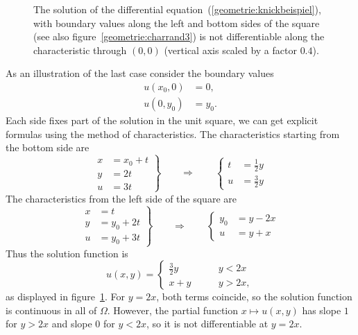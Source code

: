 \begin{figure}
\centering
{}
\caption{The solution of the differential
equation~(\ref{geometrie:knickbeispiel}),
with boundary values along the left and bottom sides of the square
(see also figure~\ref{geometrie:charrand3})
is not differentiable along the characteristic through $(0,0)$
(vertical axis scaled by a factor $0.4$).
\label{geometrie:knick}}
\end{figure}

As an illustration of the last case consider the boundary values
\begin{align*}
u(x_0,0)&=0,\\
u(0,y_0)&=y_0.
\end{align*}
Each side fixes part of the solution in the unit square, we can get 
explicit formulas using the method of characteristics.
The characteristics starting from the bottom side are
\[
\left.
\begin{aligned}
x&=x_0+t\\
y&=2t\\
u&=3t
\end{aligned}
\right\}
\qquad\Rightarrow\qquad
\left\{
\begin{aligned}
t&=\frac12y\\
u&=\frac32y
\end{aligned}
\right.
\]
The characteristics from the left side of the square are
\[
\left.
\begin{aligned}
x&=t\\
y&=y_0+2t\\
u&=y_0+3t
\end{aligned}
\right\}
\qquad\Rightarrow\qquad
\left\{
\begin{aligned}
y_0&=y-2x\\
u&=y+x
\end{aligned}
\right.
\]
Thus the solution function is
\[
u(x,y)=\begin{cases}
\frac32y&\qquad y<2x\\
x+y&\qquad y>2x,
\end{cases}
\]
as displayed in figure~\ref{geometrie:knick}.
For $y=2x$, both terms coincide, so the solution function is continuous
in all of $\Omega$.
However, the partial function $x\mapsto u(x,y)$ has slope $1$
for $y>2x$ and slope $0$ for $y<2x$, so it is not differentiable at $y=2x$.

